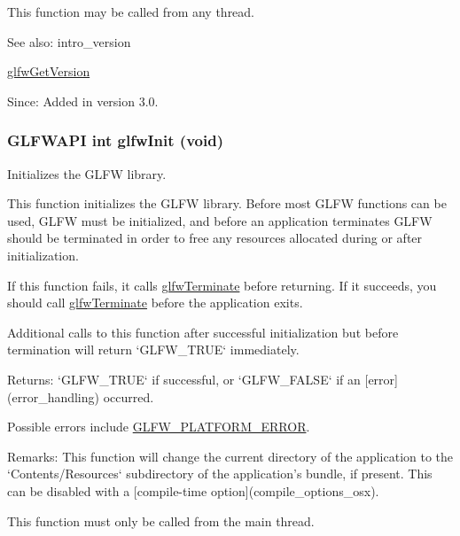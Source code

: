 This function may be called from any thread.

\begin{Desc}
\item[See also:]intro\_\-version 

\hyperlink{group__init_g2402c7824ac0194c13722790ff9559ff}{glfwGetVersion}\end{Desc}
\begin{Desc}
\item[Since:]Added in version 3.0. \end{Desc}
\hypertarget{group__init_gb41771f0215a2e0afb4cf1cf98082d40}{
\subsubsection[glfwInit]{\setlength{\rightskip}{0pt plus 5cm}GLFWAPI int glfwInit (void)}}
\label{group__init_gb41771f0215a2e0afb4cf1cf98082d40}


Initializes the GLFW library. 

This function initializes the GLFW library. Before most GLFW functions can be used, GLFW must be initialized, and before an application terminates GLFW should be terminated in order to free any resources allocated during or after initialization.

If this function fails, it calls \hyperlink{group__init_gfd90e6fd4819ea9e22e5e739519a6504}{glfwTerminate} before returning. If it succeeds, you should call \hyperlink{group__init_gfd90e6fd4819ea9e22e5e739519a6504}{glfwTerminate} before the application exits.

Additional calls to this function after successful initialization but before termination will return `GLFW\_\-TRUE` immediately.

\begin{Desc}
\item[Returns:]`GLFW\_\-TRUE` if successful, or `GLFW\_\-FALSE` if an \mbox{[}error\mbox{]}(error\_\-handling) occurred.\end{Desc}
Possible errors include \hyperlink{group__errors_gd44162d78100ea5e87cdd38426b8c7a1}{GLFW\_\-PLATFORM\_\-ERROR}.

\begin{Desc}
\item[Remarks:]This function will change the current directory of the application to the `Contents/Resources` subdirectory of the application's bundle, if present. This can be disabled with a \mbox{[}compile-time option\mbox{]}(compile\_\-options\_\-osx).\end{Desc}
This function must only be called from the main thread.

